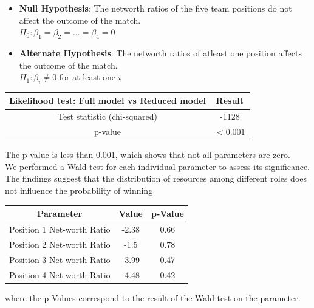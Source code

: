 \documentclass[11pt]{article}
\begin{document}
\begin{itemize}
    \item \textbf{Null Hypothesis}: The networth ratios of the five team positions
    do not affect the outcome of the match.
    \\ \(H_0: \beta_1 = \beta_2 = \dots = \beta_4 = 0\)
    \item \textbf{Alternate Hypothesis}: The networth ratios of atleast one position
    affects the outcome of the match.
    \\ \(H_1: \beta_i \neq 0\) for at least one \(i\)
\end{itemize}
\begin{table}[h]
    \centering
    \begin{tabular}{|c|c|}
        \hline
        \textbf{Likelihood test: Full model vs Reduced model} & \textbf{Result} \\
        \hline
        Test statistic (chi-squared) & -1128 \\
        p-value & $< 0.001$ \\
        \hline
    \end{tabular}
\end{table}
The p-value is less than 0.001, which shows that not all parameters are zero.
\\[\baselineskip]
We performed a Wald test for each individual parameter to assess its significance.
The findings suggest that the distribution of resources among different roles does
not influence the probability of winning
\begin{table}[h]
    \centering
    \begin{tabular}{|c|c|c|}
        \hline
        \textbf{Parameter} & \textbf{Value} & \textbf{p-Value} \\
        \hline
        Position 1 Net-worth Ratio & -2.38 & 0.66\\
        Position 2 Net-worth Ratio & -1.5 & 0.78\\
        Position 3 Net-worth Ratio & -3.99 & 0.47\\
        Position 4 Net-worth Ratio & -4.48 & 0.42\\
        \hline
    \end{tabular}
\end{table}
where the p-Values correspond to the result of the Wald test on the parameter.
\end{document}
